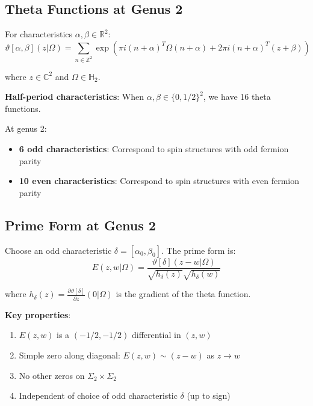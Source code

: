 \subsection{Theta Functions at Genus 2}

\begin{definition}
\label{def:theta-genus2}
For characteristics $\alpha, \beta \in \mathbb{R}^2$:
\begin{equation}
\vartheta[\alpha, \beta](z|\Omega) = \sum_{n \in \mathbb{Z}^2} \exp\left(\pi i (n+\alpha)^T \Omega (n+\alpha) 
+ 2\pi i (n+\alpha)^T (z+\beta)\right)
\end{equation}

where $z \in \mathbb{C}^2$ and $\Omega \in \mathbb{H}_2$.

\textbf{Half-period characteristics}: When $\alpha, \beta \in \{0, 1/2\}^2$, we have 16 theta functions.
\end{definition}

\begin{theorem}
\label{thm:odd-even-g2}
At genus 2:
\begin{itemize}
\item \textbf{6 odd characteristics}: Correspond to spin structures with odd fermion parity
\item \textbf{10 even characteristics}: Correspond to spin structures with even fermion parity
\end{itemize}
\end{theorem}

\subsection{Prime Form at Genus 2}

\begin{definition}[Prime Form $E(z,w)$ for $g=2$]
\label{def:prime-form-g2}
Choose an odd characteristic $\delta = [\alpha_0, \beta_0]$. The prime form is:
\begin{equation}
E(z,w|\Omega) = \frac{\vartheta[\delta](z-w|\Omega)}{\sqrt{h_\delta(z)} \sqrt{h_\delta(w)}}
\end{equation}

where $h_\delta(z) = \frac{\partial \vartheta[\delta]}{\partial z}(0|\Omega)$ is the gradient of the theta function.

\textbf{Key properties}:
\begin{enumerate}
\item $E(z,w)$ is a $(-1/2, -1/2)$ differential in $(z,w)$
\item Simple zero along diagonal: $E(z,w) \sim (z-w)$ as $z \to w$
\item No other zeros on $\Sigma_2 \times \Sigma_2$
\item Independent of choice of odd characteristic $\delta$ (up to sign)
\end{enumerate}
\end{definition}


